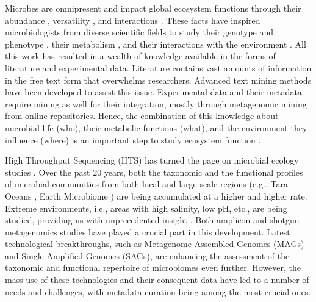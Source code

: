    Microbes are omnipresent and impact global ecosystem functions \parencite{falkowski2008microbial} through their abundance \parencite{bar2018biomass}, versatility \parencite{delgado2016microbial}, and interactions \parencite{rottjers2018hairballs}. 
   These facts have inspired microbiologists from diverse scientific fields to study their genotype and phenotype \parencite{morris2020linking}, their metabolism \parencite{biggs2015metabolic}, and their interactions with the environment \parencite{hall2018understanding}. 
   All this work has resulted in a wealth of knowledge available in the forms of literature and experimental data. Literature contains vast amounts of information in the free text form that overwhelms researchers. 
   Advanced text mining methods \parencite{jensen2006Literature} have been developed to assist this issue. 
   Experimental data and their metadata require mining \parencite{delmont2011metagenomic} as well for their integration, mostly through metagenomic mining from online repositories. 
   Hence, the combination of this knowledge about microbial life (who), their metabolic functions (what), and the environment they influence (where) is an important step to study ecosystem function \parencite{raes2008Molecular}.

   High Throughput Sequencing (HTS) has turned the page on microbial ecology studies \parencite{nilsson2019mycobiome}. 
   Over the past 20 years, both the taxonomic and the functional profiles of microbial communities from both local and large-scale regions (e.g., Tara Oceans \parencite{pesant2015open}, Earth Microbiome \parencite{gilbert2014earth}) are being accumulated at a higher and higher rate. 
   Extreme environments, i.e., areas with high salinity, low pH, etc., are being studied, providing us with unprecedented insight \parencite{shu2021microbial}. 
   Both amplicon and shotgun metagenomics studies have played a crucial part in this development. Latest technological breakthroughs, such as Metagenome-Assembled Genomes (MAGs) and Single Amplified Genomes (SAGs), are enhancing the assessment of the taxonomic and functional repertoire of microbiomes even further. 
   However, the mass use of these technologies and their consequent data have led to a number of needs and challenges, with metadata curation being among the most crucial ones.

